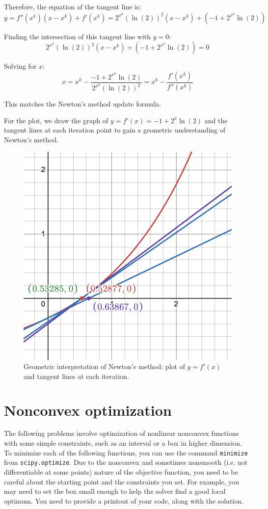 \documentclass{article}
\begin{document}
\begin{enumerate}
    Therefore, the equation of the tangent line is:
    $$y = f''(x^k)(x - x^k) + f'(x^k) = 2^{x^k} (\ln(2))^2(x - x^k) + (-1 + 2^{x^k} \ln(2))$$
    
    Finding the intersection of this tangent line with $y=0$:
    $$2^{x^k} (\ln(2))^2(x - x^k) + (-1 + 2^{x^k} \ln(2)) = 0$$
    
    Solving for $x$:
    $$x = x^k - \frac{-1 + 2^{x^k} \ln(2)}{2^{x^k} (\ln(2))^2} = x^k - \frac{f'(x^k)}{f''(x^k)}$$
    
    This matches the Newton's method update formula.
    
    For the plot, we draw the graph of $y=f'(x) = -1 + 2^x \ln(2)$ and the tangent lines at each iteration point to gain a geometric understanding of Newton's method.
\begin{figure}[H]
    \centering
    \includegraphics[width=0.7\linewidth]{HW4-1-1.png}
    \caption{Geometric interpretation of Newton's method: plot of $y=f'(x)$ and tangent lines at each iteration.}
    \label{fig:newton_geom}
\end{figure}
    
    
\end{enumerate}

\section{Nonconvex optimization}
The following problems involve optimization of nonlinear nonconvex functions with some simple constraints, such as an interval or a box in higher dimension. 
To minimize each of the following functions, you can use the command {\tt minimize} from {\tt scipy.optimize}. Due to the nonconvex and sometimes nonsmooth (i.e. not differentiable at some points) nature of the objective function, you need to be careful about the starting point and the constraints you set. For example, you may need to set the box small enough to help the solver find a good local optimum. You need to provide a printout of your code, along with the solution. 
\end{document}
